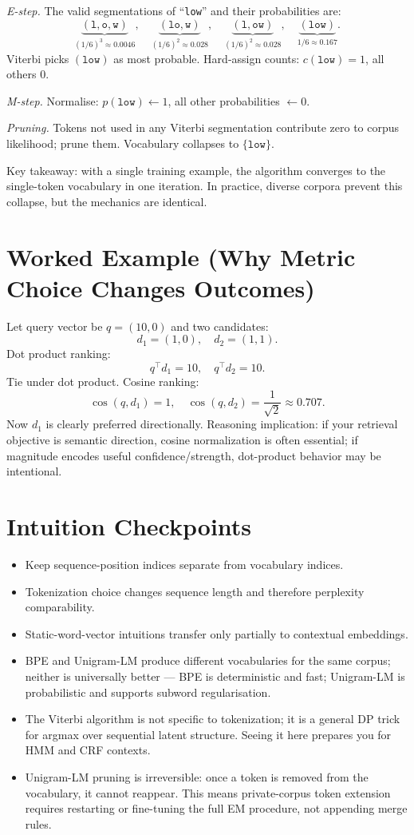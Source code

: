\emph{E-step.} The valid segmentations of ``\texttt{low}'' and their probabilities are:
\[
  \underbrace{(\texttt{l},\texttt{o},\texttt{w})}_{(1/6)^3 \approx 0.0046},\quad
  \underbrace{(\texttt{lo},\texttt{w})}_{(1/6)^2 \approx 0.028},\quad
  \underbrace{(\texttt{l},\texttt{ow})}_{(1/6)^2 \approx 0.028},\quad
  \underbrace{(\texttt{low})}_{1/6 \approx 0.167}.
\]
Viterbi picks \((\texttt{low})\) as most probable. Hard-assign counts: $c(\texttt{low})=1$, all others $0$.

\emph{M-step.} Normalise: $p(\texttt{low}) \leftarrow 1$, all other probabilities $\leftarrow 0$.

\emph{Pruning.} Tokens not used in any Viterbi segmentation contribute zero to corpus likelihood; prune them. Vocabulary collapses to $\{\texttt{low}\}$.

Key takeaway: with a single training example, the algorithm converges to the single-token vocabulary in one iteration. In practice, diverse corpora prevent this collapse, but the mechanics are identical.

\section*{Worked Example (Why Metric Choice Changes Outcomes)}
Let query vector be $q=(10,0)$ and two candidates:
\[
d_1=(1,0),\quad d_2=(1,1).
\]
Dot product ranking:
\[
q^\top d_1 = 10,\quad q^\top d_2 = 10.
\]
Tie under dot product.
Cosine ranking:
\[
\cos(q,d_1)=1,\quad \cos(q,d_2)=\frac{1}{\sqrt{2}}\approx0.707.
\]
Now $d_1$ is clearly preferred directionally.  
Reasoning implication: if your retrieval objective is semantic direction, cosine normalization is often essential; if magnitude encodes useful confidence/strength, dot-product behavior may be intentional.

\section*{Intuition Checkpoints}
\begin{itemize}[leftmargin=1.5em]
  \item Keep sequence-position indices separate from vocabulary indices.
  \item Tokenization choice changes sequence length and therefore perplexity comparability.
  \item Static-word-vector intuitions transfer only partially to contextual embeddings.
  \item BPE and Unigram-LM produce different vocabularies for the same corpus; neither is universally better --- BPE is deterministic and fast; Unigram-LM is probabilistic and supports subword regularisation.
  \item The Viterbi algorithm is not specific to tokenization; it is a general DP trick for argmax over sequential latent structure. Seeing it here prepares you for HMM and CRF contexts.
  \item Unigram-LM pruning is irreversible: once a token is removed from the vocabulary, it cannot reappear. This means private-corpus token extension requires restarting or fine-tuning the full EM procedure, not appending merge rules.
\end{itemize}

